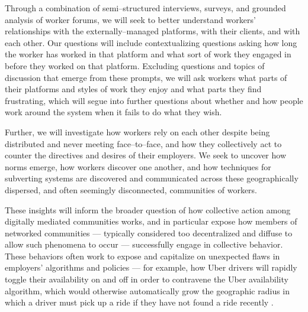 \documentclass[11pt]{article}
\begin{document}
Through a combination of
  semi--structured interviews,
  surveys, and
  grounded analysis of worker forums,
we will seek to better understand workers' relationships
  with the externally--managed platforms,
  with their clients, and
  with each other.
Our questions will include
contextualizing questions asking
  how long the worker has worked in that platform and
  what sort of work they engaged in before they worked on that platform.
Excluding questions and topics of discussion that emerge from these prompts,
we will ask workers
  what parts of their platforms and styles of work they enjoy and
  what parts they find frustrating,
which will segue into further questions about
whether and how people work around the system when it fails to do what they wish.

Further,
we will investigate how workers rely on each other
despite being distributed and never meeting face--to--face,
and how they collectively act to counter the directives and desires of their employers.
We seek to uncover
  how norms emerge,
  how workers discover one another, and
  how techniques for subverting systems are
discovered and
communicated across these geographically dispersed,
and often seemingly disconnected,
communities of workers.

These insights will inform the broader question of
how collective action among digitally mediated communities works,
and in particular expose how members of networked communities
--- typically considered too decentralized and diffuse to allow such phenomena to occur ---
successfully engage in collective behavior.
These behaviors often work
to expose and
capitalize on unexpected flaws in employers' algorithms and policies
--- for example, how Uber drivers will rapidly toggle their availability on and off
in order to contravene the Uber availability algorithm,
which would otherwise automatically grow the geographic radius in which a driver must pick up a ride if they have not found a ride recently
\citep{uberAlgorithm}.
\end{document}
